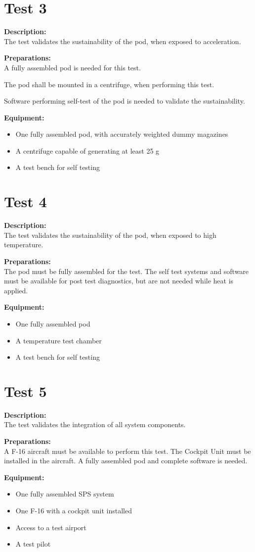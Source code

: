 \documentclass[Main]{subfiles}
\begin{document}
\section{Test 3}
\textbf{Description: }\\
The test validates the sustainability of the pod, when exposed to acceleration.

\textbf{Preparations: }\\
A fully assembled pod is needed for this test. 

The pod shall be mounted in a centrifuge, when performing this test.

Software performing self-test of the pod is needed to validate the sustainability.

\textbf{Equipment:}
\begin{itemize}
\item One fully assembled pod, with accurately weighted dummy magazines
\item A centrifuge capable of generating at least 25 g
\item A test bench for self testing
\end{itemize}

\section{Test 4}
\textbf{Description: }\\
The test validates the sustainability of the pod, when exposed to high temperature.

\textbf{Preparations: }\\
The pod must be fully assembled for the test.
The self test systems and software must be available for post test diagnostics, but are not needed while heat is applied. 

\textbf{Equipment:}
\begin{itemize}
\item One fully assembled pod
\item A temperature test chamber
\item A test bench for self testing
\end{itemize}

\section{Test 5}
\textbf{Description: }\\
The test validates the integration of all system components.

\textbf{Preparations: }\\
A F-16 aircraft must be available to perform this test. The Cockpit Unit must be installed in the aircraft.
A fully assembled pod and complete software is needed.

\textbf{Equipment:}
\begin{itemize}
\item One fully assembled SPS system
\item One F-16 with a cockpit unit installed
\item Access to a test airport
\item A test pilot

\end{itemize}
\end{document}
